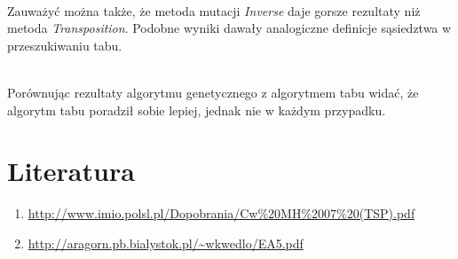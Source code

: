 \documentclass{article}
\begin{document}
\\

Zauważyć można także, że metoda mutacji \textit{Inverse} daje gorsze rezultaty niż metoda \textit{Transposition}. Podobne wyniki dawały analogiczne definicje sąsiedztwa w przeszukiwaniu tabu.  

\\
Porównując rezultaty algorytmu genetycznego z algorytmem tabu widać, 
że algorytm tabu poradził sobie lepiej, jednak nie w każdym przypadku.

\section{Literatura}
\begin{enumerate}
    \item \url{http://www.imio.polsl.pl/Dopobrania/Cw\%20MH\%2007\%20(TSP).pdf}
    \item \url{http://aragorn.pb.bialystok.pl/~wkwedlo/EA5.pdf}
\end{enumerate}
\end{document}
